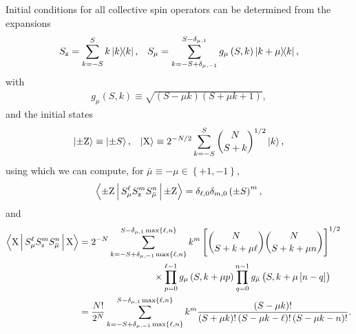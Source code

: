 \documentclass[aps,notitlepage,nofootinbib,11pt]{revtex4-1}
\newcommand{\f}[2]{\dfrac{#1}{#2}} %
\newcommand{\p}[1]{\left(#1\right)} %
\renewcommand{\sp}[1]{\left[#1\right]} %
\renewcommand{\set}[1]{\left\{#1\right\}} %
\renewcommand{\c}{\cdot} %
\newcommand{\bk}{\Braket} %
\newcommand{\F}{\mathcal{F}}
\newcommand{\z}{\text{z}}
\newcommand{\Z}{\text{Z}}
\newcommand{\X}{\text{X}}
\newcommand{\bmu}{{\bar\mu}}
\newcommand{\1}{\mathds{1}}
\begin{document}
Initial conditions for all collective spin operators can be determined
from the expansions
\begin{align}
  S_\z = \sum_{k=-S}^S k \op{k},
  &&
  S_\mu = \sum_{k=-S+\delta_{\mu,-1}}^{S-\delta_{\mu,1}}
  g_\mu\p{S,k} \op{k+\mu}{k},
\end{align}
with
\begin{align}
  g_\mu\p{S,k} \equiv \sqrt{\p{S-\mu k}\p{S+\mu k+1}},
\end{align}
and the initial states
\begin{align}
  \ket{\pm\Z} \equiv \ket{\pm S},
  &&
  \ket{\X} \equiv 2^{-N/2} \sum_{k=-S}^S
  { N \choose S+k }^{1/2} \ket{k},
\end{align}
using which we can compute, for $\bmu\equiv-\mu\in\set{+1,-1}$,
\begin{align}
  \bk{\pm\Z|S_\mu^\ell S_\z^m S_\bmu^n|\pm\Z}
  = \delta_{\ell,0} \delta_{m,0} \p{\pm S}^m,
\end{align}
and
\begin{align}
  \bk{\X|S_\mu^\ell S_\z^m S_\bmu^n|\X}
  &=  2^{-N} \sum_{k=-S+\delta_{\mu,-1}\max\set{\ell,n}}
  ^{S-\delta_{\mu,1}\max\set{\ell,n}} k^m
  \sp{{ N \choose S+k+\mu\ell } { N \choose S+k+\mu n }}^{1/2}
  \notag \\
  &\qquad\qquad\qquad\qquad
  \times \prod_{p=0}^{\ell-1} g_\mu\p{S,k+\mu p}
  \prod_{q=0}^{n-1} g_\bmu\p{S,k+\mu\sp{n-q}} \\
  &= \f{N!}{2^N} \sum_{k=-S+\delta_{\mu,-1}\max\set{\ell,n}}
  ^{S-\delta_{\mu,1}\max\set{\ell,n}} k^m
  \f{\p{S-\mu k}!}{\p{S+\mu k}!\p{S-\mu k-\ell}!\p{S-\mu k-n}!}.
\end{align}
\end{document}
